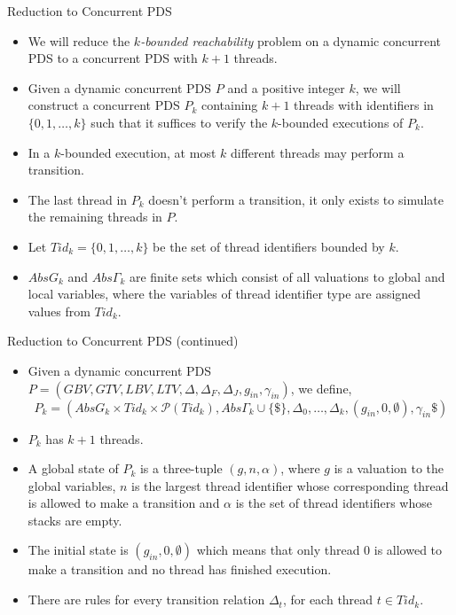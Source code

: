 \documentclass[10pt,notheorems]{beamer}
\theoremstyle{plain} %
\begin{document}
\begin{frame}{Reduction to Concurrent PDS}
    \begin{itemize}
        \item We will reduce the \textit{$k$-bounded reachability} problem on a dynamic concurrent
        PDS to a concurrent PDS with $k+1$ threads. 
        \item Given a dynamic concurrent PDS $P$ and a positive integer $k$, we will construct a 
        concurrent PDS $P_k$ containing $k+1$ threads with identifiers in $\{0,1,\dots,k\}$ such that 
        it suffices to verify the $k$-bounded executions of $P_k$.
        \item In a $k$-bounded execution, at most $k$ different threads may perform a transition. 
        \item The last thread in $P_k$ doesn't perform a transition, it only exists to simulate
        the remaining threads in $P$. 
        \item Let $Tid_k=\{0,1,\dots, k\}$ be the set of thread identifiers bounded by $k$. 
        \item $AbsG_k$ and $Abs\Gamma_k$ are finite sets which consist of all valuations to global and local variables, 
        where the variables of thread identifier type are assigned values from $Tid_k$.  
    \end{itemize}
\end{frame}
\begin{frame}{Reduction to Concurrent PDS (continued)}
    \begin{itemize}
        \item Given a dynamic concurrent PDS $P=(GBV,GTV,LBV,LTV,\Delta,\Delta_F,\Delta_J,g_{in},\gamma_{in})$, we define,
        \[ P_k=(AbsG_k\times Tid_k\times \mathscr{P}(Tid_k),Abs\Gamma_k\cup \{\$\}, \Delta_0,\dots,\Delta_k,(g_{in},0,\emptyset),\gamma_{in}\$)\]
        \item $P_k$ has $k+1$ threads.
        \item A global state of $P_k$ is a three-tuple $(g,n,\alpha)$, where $g$ is a valuation to the global variables,
        $n$ is the largest thread identifier whose corresponding thread is allowed to make a transition and 
        $\alpha$ is the set of thread identifiers whose stacks are empty.
        \item The initial state is $(g_{in},0,\emptyset)$ which means that only thread $0$ is allowed to make 
        a transition and no thread has finished execution.
        \item There are rules for every transition relation $\Delta_t$, for each thread $t\in Tid_k$.
    \end{itemize}
\end{frame}
\end{document}
